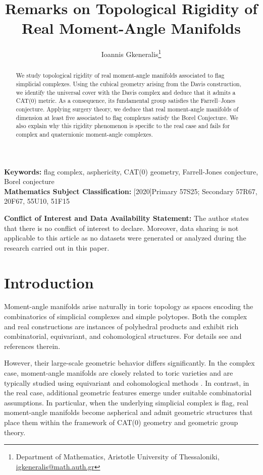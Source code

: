 \documentclass[11pt,a4paper]{article}
\title{Remarks on Topological Rigidity of Real Moment-Angle Manifolds}
\author{Ioannis Gkeneralis\footnote{Department of Mathematics, Aristotle University of Thessaloniki, \href{mailto:igkeneralis@math.auth.gr}{igkeneralis@math.auth.gr}}}
\date{ }
\numberwithin{equation}{section}
\theoremstyle{named}
\newcommand{\keywords}[1]{\textbf{Keywords: } #1}
\newcommand{\msc}[1]{\textbf{Mathematics Subject Classification: } #1}
\begin{document}
\vspace{-0.5cm}

\maketitle

\begin{abstract}
We study topological rigidity of real moment-angle manifolds associated to flag simplicial complexes. Using the cubical geometry arising from the Davis construction, we identify the universal cover with the Davis complex and deduce that it admits a CAT(0) metric. As a consequence, its fundamental group satisfies the Farrell--Jones conjecture. Applying surgery theory, we deduce that real moment-angle manifolds of dimension at least five associated to flag complexes satisfy the Borel Conjecture. We also explain why this rigidity phenomenon is specific to the real case and fails for complex and quaternionic moment-angle complexes.
\end{abstract}


\noindent \keywords{flag complex, asphericity, CAT(0) geometry, Farrell-Jones conjecture, Borel conjecture} \\[1ex]
\msc[2020]{Primary  57S25; Secondary 57R67, 20F67, 55U10, 51F15 }

\vspace{0.5ex}
\noindent \textbf{Conflict of Interest and Data Availability Statement:} The author states that there is no conflict of interest to declare. Moreover, data sharing is not applicable to this article as no datasets were generated or analyzed during the research carried out in this paper.



\section{Introduction}

Moment-angle manifolds arise naturally in toric topology as spaces encoding the combinatorics of simplicial complexes and simple polytopes. Both the complex and real constructions are instances of polyhedral products and exhibit rich combinatorial, equivariant, and cohomological structures. For details see \cite{bbhg,tt} and references therein.


However, their large-scale geometric behavior differs significantly. In the complex case, moment-angle manifolds are closely related to toric varieties and are typically studied using equivariant and cohomological methods \cite{dj}. In contrast, in the real case, additional geometric features emerge under suitable combinatorial assumptions. In particular, when the underlying simplicial complex is flag, real moment-angle manifolds become aspherical and admit geometric structures that place them within the framework of CAT(0) geometry and geometric group theory.
\end{document}
